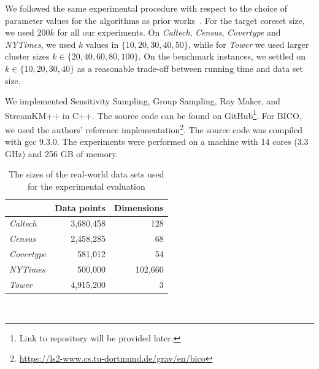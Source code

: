 We followed the same experimental procedure with respect to the choice of parameter values for the algorithms as prior works~\cite{AckermannMRSLS12, FGSSS13}. For the target coreset size, we used $200k$ for all our experiments. On \textit{Caltech}, \textit{Census},  \textit{Covertype} and \textit{NYTimes}, we used $k$ values in $\{10, 20, 30, 40, 50\}$, while for \textit{Tower} we used larger cluster sizes $k \in \{20, 40, 60, 80, 100\}$. On the benchmark instances, we settled on $k \in \{10, 20, 30, 40\}$ as a reasonable trade-off between running time and data set size.


We implemented Sensitivity Sampling, Group Sampling, Ray Maker, and StreamKM++ in C++. The source code can be found on GitHub\footnote{Link to repository will be provided later.}. For BICO, we used the authors' reference implementation\footnote{\url{https://ls2-www.cs.tu-dortmund.de/grav/en/bico}}. The source code was compiled with gcc 9.3.0. The experiments were performed on a machine with 14 cores (3.3 GHz) and 256 GB of memory.





%
\begin{table}
	\begin{center}%
	\caption{The sizes of the real-world data sets used for the experimental evaluation}
	\label{tab:real-world-datasets-overview}
	\begin{tabular}{lrr}
		\toprule
        
		    & Data points
		    & Dimensions
            \\
		\midrule
		\textit{Caltech}
    		& 3,680,458
    		& 128
    		\\
		\textit{Census}
    		& 2,458,285
    		& 68
    		\\
	    \textit{Covertype}
    	    & 581,012
    		& 54
    		\\
	    \textit{NYTimes}
    	    & 500,000
    		& 102,660
    		\\
        \textit{Tower}
            & 4,915,200
    		& 3
    		\\
		\bottomrule
	\end{tabular}\\
	\end{center}
\end{table}



